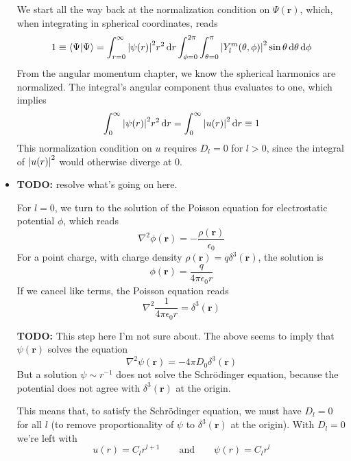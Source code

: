 \documentclass[11pt, a4paper]{article}
\newcommand{\diff}{\mathop{}\!\mathrm{d}} %
\renewcommand{\laplacian}{\nabla^{2}}
\newcommand{\eqtext}[1]{\qquad \text{#1} \qquad}
\newcommand{\Schro}{Schr\"{o}dinger\xspace}
\renewcommand{\vec}[1]{\bm{#1}}  %
\renewcommand{\r}{\vec{r}}  %
\newcommand{\p}{\psi}  %
\renewcommand{\P}{\Psi}  %
\begin{document}
\begin{itemize}
	We start all the way back at the normalization condition on $ \P(\r) $, which, when integrating in spherical coordinates, reads
	\begin{equation*}
		1 \equiv \braket{\P}{\P} = \int_{r = 0}^{\infty}\abs{\p(r)}^{2}r^{2}\diff r \int_{\phi = 0}^{2\pi}\int_{\theta = 0}^{\pi}\abs{Y_{l}^{m}(\theta, \phi)}^{2}\sin \theta \diff \theta \diff \phi 
	\end{equation*}
	From the angular momentum chapter, we know the spherical harmonics are normalized. The integral's angular component thus evaluates to one, which implies
	\begin{equation*}
		\int_{ 0}^{\infty}\abs{\p(r)}^{2}r^{2}\diff r = \int_{0}^{\infty}\abs{u(r)}^{2}\diff r \equiv 1
	\end{equation*}
	This normalization condition on $ u $ requires $ D_{l} = 0 $ for $ l > 0 $, since the integral of $ \abs{u(r)}^{2} $ would otherwise diverge at $ 0 $. 
	
	\item \textbf{TODO:} resolve what's going on here.
	
	For $ l = 0 $, we turn to the solution of the Poisson equation for electrostatic potential $ \phi $, which reads
	\begin{equation*}
		\laplacian \phi(\r) = -\frac{\rho(\r)}{\epsilon_{0}}
	\end{equation*}
	For a point charge, with charge density $ \rho(\r) = q \delta^{3}(\r) $, the solution is 
	\begin{equation*}
		\phi(\r) = \frac{q}{4\pi \epsilon_{0}r}
	\end{equation*}
	If we cancel like terms, the Poisson equation reads
	\begin{equation*}
		\laplacian \frac{1}{4\pi \epsilon_{0}r} = \delta^{3}(\r)
	\end{equation*}
	
	\textbf{TODO:} This step here I'm not sure about. The above seems to imply that $ \p(\r) $ solves the equation
	\begin{equation*}
		\laplacian \p(\r) = - 4 \pi D_{0} \delta^{3}(\r)
	\end{equation*}
	But a solution $ \p \sim r^{-1} $ does not solve the \Schro equation, because the potential does not agree with $ \delta^{3}(\r) $ at the origin. 
	
	This means that, to satisfy the \Schro equation, we must have $ D_{l} = 0 $ for all $ l $ (to remove proportionality of $ \psi $ to $ \delta^{3}(\r) $ at the origin). With $ D_{l} = 0 $ we're left with 
	\begin{equation*}
		u(r) = C_{l}r^{l+1} \eqtext{and} \p(r) = C_{l}r^{l}
	\end{equation*}
	
\end{itemize}
\end{document}
